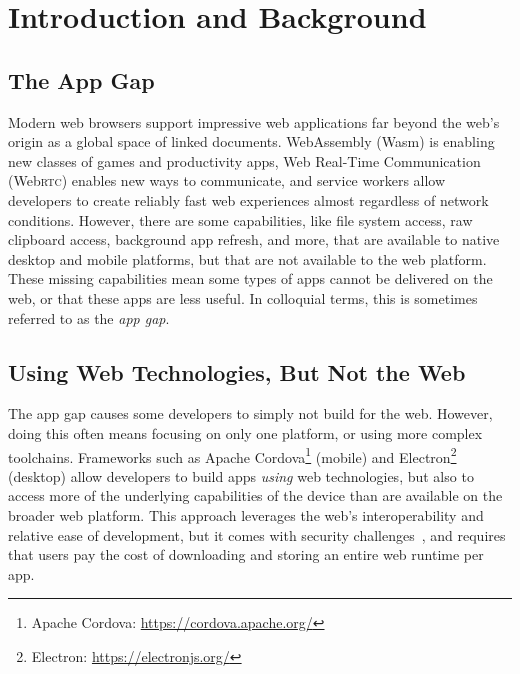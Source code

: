 \documentclass[sigconf]{acmart}
\begin{document}

\maketitle

\section{Introduction and Background}

\subsection{The App Gap}

Modern web browsers support impressive web applications far beyond
the web's origin as a global space of linked documents.
WebAssembly (Wasm) is enabling new classes of games and productivity apps,
Web Real-Time Communication (Web\textsc{rtc}) enables new ways to communicate,
and service workers allow developers to create reliably fast web experiences
almost regardless of network conditions.
However, there are some capabilities, like file system access,
raw clipboard access, background app refresh, and more,
that are available to native desktop and mobile platforms,
but that are not available to the web platform.
These missing capabilities mean some types of apps cannot be delivered on the web,
or that these apps are less useful.
In colloquial terms, this is sometimes referred to as the \textit{app gap}.

\subsection{Using Web Technologies, But Not the Web}

The app gap causes some developers to simply not build for the web.
However, doing this often means focusing on only one platform,
or using more complex toolchains.
Frameworks such as Apache Cordova\footnote{Apache Cordova:
\url{https://cordova.apache.org/}} (mobile)
and Electron\footnote{Electron: \url{https://electronjs.org/}} (desktop)
allow developers to build apps \textit{using} web technologies,
but also to access more of the underlying capabilities of the device
than are available on the broader web platform.
This approach leverages the web's interoperability and relative ease of development,
but it comes with security challenges~\cite{carettoni17,luo11},
and requires that users pay the cost of downloading and storing an entire web runtime per app.
\end{document}
